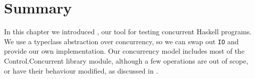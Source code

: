 







\section{Summary}

In this chapter we introduced \dejafu{}, our tool for testing
concurrent Haskell programs.  We use a typeclass abstraction over
concurrency, so we can swap out \verb|IO| and provide our own
implementation.  Our concurrency model includes most of the
Control.Concurrent\cite{control_concurrent} library module, although a
few operations are out of scope, or have their behaviour modified, as
discussed in .

